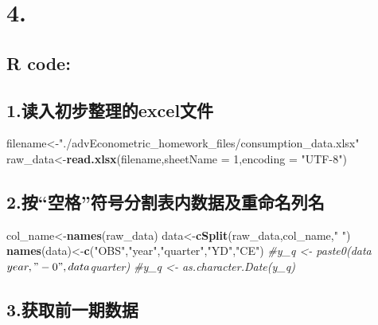 \documentclass[]{article}
\title{}
\author{}
\date{}
\newenvironment{Shaded}{\begin{snugshade}}{\end{snugshade}}
\newcommand{\KeywordTok}[1]{\textcolor[rgb]{0.13,0.29,0.53}{\textbf{{#1}}}}
\newcommand{\DataTypeTok}[1]{\textcolor[rgb]{0.13,0.29,0.53}{{#1}}}
\newcommand{\DecValTok}[1]{\textcolor[rgb]{0.00,0.00,0.81}{{#1}}}
\newcommand{\StringTok}[1]{\textcolor[rgb]{0.31,0.60,0.02}{{#1}}}
\newcommand{\CommentTok}[1]{\textcolor[rgb]{0.56,0.35,0.01}{\textit{{#1}}}}
\newcommand{\NormalTok}[1]{{#1}}
\begin{document}
\section{\texorpdfstring{\textbf{4.}}{4.}}\label{section}

\subsection{R code:}\label{r-code}

\subsection{1.读入初步整理的excel文件}\label{excel}

\begin{Shaded}
\begin{Highlighting}[]
\NormalTok{filename<-}\StringTok{"./advEconometric_homework_files/consumption_data.xlsx"}
\NormalTok{raw_data<-}\KeywordTok{read.xlsx}\NormalTok{(filename,}\DataTypeTok{sheetName =} \DecValTok{1}\NormalTok{,}\DataTypeTok{encoding =} \StringTok{"UTF-8"}\NormalTok{)}
\end{Highlighting}
\end{Shaded}

\subsection{\texorpdfstring{2.按``空格''符号分割表内数据及重命名列名}{2.按空格符号分割表内数据及重命名列名}}

\begin{Shaded}
\begin{Highlighting}[]
\NormalTok{col_name<-}\KeywordTok{names}\NormalTok{(raw_data)}
\NormalTok{data<-}\KeywordTok{cSplit}\NormalTok{(raw_data,col_name,}\StringTok{" "}\NormalTok{)}
\KeywordTok{names}\NormalTok{(data)<-}\KeywordTok{c}\NormalTok{(}\StringTok{"OBS"}\NormalTok{,}\StringTok{"year"}\NormalTok{,}\StringTok{"quarter"}\NormalTok{,}\StringTok{"YD"}\NormalTok{,}\StringTok{"CE"}\NormalTok{)}
\CommentTok{#y_q <- paste0(data$year,"-0",data$quarter)}
\CommentTok{#y_q <- as.character.Date(y_q)}
\end{Highlighting}
\end{Shaded}

\subsection{3.获取前一期数据}
\end{document}
